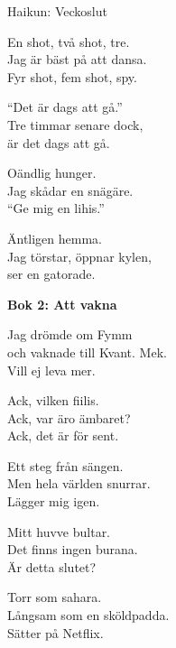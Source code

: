 \documentclass{spektraklet}
\begin{document}
\begin{artikel}{Haikun: Veckoslut}{}
\begin{center}
En shot, två shot, tre.\\
Jag är bäst på att dansa.\\
Fyr shot, fem shot, spy.
\end{center}

\begin{flushright}
``Det är dags att gå.''\\
Tre timmar senare dock,\\
är det dags att gå.
\end{flushright}

\begin{flushleft}
Oändlig hunger.\\
Jag skådar en snägäre.\\
``Ge mig en lihis.''
\end{flushleft}

\begin{center}
Äntligen hemma.\\
Jag törstar, öppnar kylen,\\
ser en gatorade.
\end{center}

\vspace{0.8cm}

\textbf{Bok 2: Att vakna}

\begin{flushleft}
Jag drömde om Fymm\\
och vaknade till Kvant. Mek.\\
Vill ej leva mer.
\end{flushleft}

\begin{center}
Ack, vilken fiilis.\\
Ack, var äro ämbaret?\\
Ack, det är för sent.
\end{center}

\begin{flushright}
Ett steg från sängen.\\
Men hela världen snurrar.\\
Lägger mig igen.
\end{flushright}

\begin{flushleft}
Mitt huvve bultar.\\
Det finns ingen burana.\\
Är detta slutet?
\end{flushleft}

\begin{center}
Torr som sahara.\\
Långsam som en sköldpadda.\\
Sätter på Netflix.
\end{center}


\end{artikel}
\end{document}
